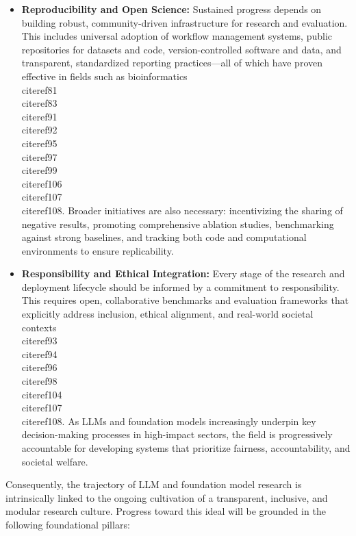 \documentclass[11pt]{article}
\begin{document}
\begin{itemize}
    \item \textbf{Reproducibility and Open Science:} Sustained progress depends on building robust, community-driven infrastructure for research and evaluation. This includes universal adoption of workflow management systems, public repositories for datasets and code, version-controlled software and data, and transparent, standardized reporting practices—all of which have proven effective in fields such as bioinformatics~\\cite{ref81}\\cite{ref83}\\cite{ref91}\\cite{ref92}\\cite{ref95}\\cite{ref97}\\cite{ref99}\\cite{ref106}\\cite{ref107}\\cite{ref108}. Broader initiatives are also necessary: incentivizing the sharing of negative results, promoting comprehensive ablation studies, benchmarking against strong baselines, and tracking both code and computational environments to ensure replicability.
    
    \item \textbf{Responsibility and Ethical Integration:} Every stage of the research and deployment lifecycle should be informed by a commitment to responsibility. This requires open, collaborative benchmarks and evaluation frameworks that explicitly address inclusion, ethical alignment, and real-world societal contexts~\\cite{ref93}\\cite{ref94}\\cite{ref96}\\cite{ref98}\\cite{ref104}\\cite{ref107}\\cite{ref108}. As LLMs and foundation models increasingly underpin key decision-making processes in high-impact sectors, the field is progressively accountable for developing systems that prioritize fairness, accountability, and societal welfare.
\end{itemize}

Consequently, the trajectory of LLM and foundation model research is intrinsically linked to the ongoing cultivation of a transparent, inclusive, and modular research culture. Progress toward this ideal will be grounded in the following foundational pillars:
\end{document}
